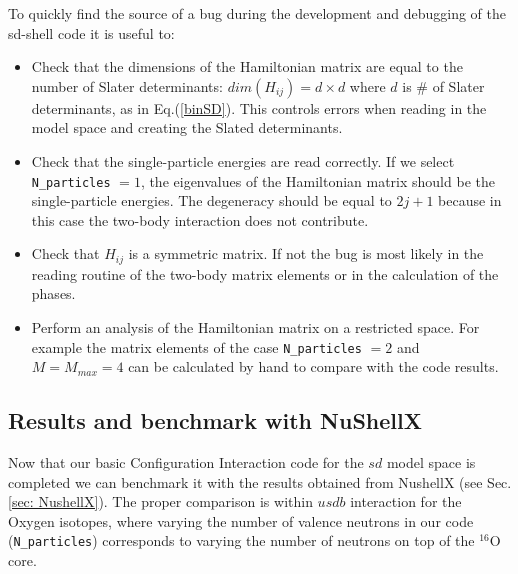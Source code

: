 \documentclass[twoside]{article}
\begin{document}
To quickly find the source of a bug during the development and debugging of the sd-shell code it is useful to:
\begin{itemize}
\item Check that the dimensions of the Hamiltonian matrix are equal to the number of Slater determinants: $dim(H_{ij})=d \times d$ where $d$ is $\#$ of Slater determinants, as in Eq.(\ref{binSD}). This controls errors when reading in the model space and creating the Slated determinants.
\item Check that the single-particle energies are read correctly. If we select \texttt{N\_particles} $=1$, the eigenvalues of the Hamiltonian matrix should be the single-particle energies. The degeneracy should be equal to $2j+1$ because in this case the two-body interaction does not contribute.
\item Check that $H_{ij}$ is a symmetric matrix. If not the bug is most likely in the reading routine of the two-body matrix elements or in the calculation of the phases.
\item Perform an analysis of the Hamiltonian matrix on a restricted space. For example the matrix elements of the case \texttt{N\_particles} $=2$ and $M=M_{max}=4$ can be calculated by hand to compare with the code results.
\end{itemize}





\subsection{Results and benchmark with NuShellX}

Now that our basic Configuration Interaction code for the $sd$ model space is completed we can benchmark it with the results obtained from NushellX (see Sec.\ref{sec: NushellX}).
The proper comparison is within $usdb$ interaction for the Oxygen isotopes, where varying the number of valence neutrons in our code (\texttt{N\_particles}) corresponds to varying the number of neutrons on top of the $^{16}$O core. 
\end{document}
